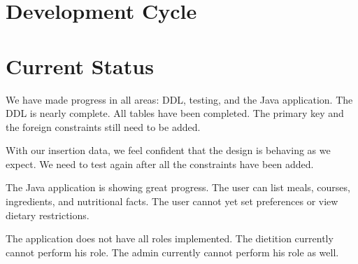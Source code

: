 \documentclass[a4paper,10pt,toc=graduated]{article}
\begin{document}
\section{Development Cycle}
\section{Current Status}
We have made progress in all areas: DDL, testing, and the Java application.
The DDL is nearly complete.
All tables have been completed.
The primary key and the foreign constraints still need to be added.
\newline

With our insertion data,
we feel confident that the design is behaving as we expect.
We need to test again after all the constraints have been added.
\newline

The Java application is showing great progress.
The user can list meals, courses, ingredients, and nutritional facts.
The user cannot yet set preferences or view dietary restrictions.
\newline

The application does not have all roles implemented.
The dietition currently cannot perform his role.
The admin currently cannot perform his role as well.
\end{document}
